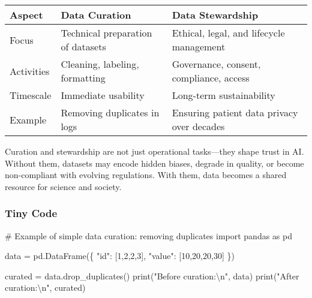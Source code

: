\documentclass[
  letterpaper,
  DIV=11,
  numbers=noendperiod]{scrreprt}
\newenvironment{Shaded}{\begin{snugshade}}{\end{snugshade}}
\newcommand{\BuiltInTok}[1]{\textcolor[rgb]{0.00,0.23,0.31}{#1}}
\newcommand{\CharTok}[1]{\textcolor[rgb]{0.13,0.47,0.30}{#1}}
\newcommand{\CommentTok}[1]{\textcolor[rgb]{0.37,0.37,0.37}{#1}}
\newcommand{\DecValTok}[1]{\textcolor[rgb]{0.68,0.00,0.00}{#1}}
\newcommand{\ImportTok}[1]{\textcolor[rgb]{0.00,0.46,0.62}{#1}}
\newcommand{\NormalTok}[1]{\textcolor[rgb]{0.00,0.23,0.31}{#1}}
\newcommand{\OperatorTok}[1]{\textcolor[rgb]{0.37,0.37,0.37}{#1}}
\newcommand{\StringTok}[1]{\textcolor[rgb]{0.13,0.47,0.30}{#1}}
\begin{document}
\begin{longtable}[]{@{}
  >{\raggedright\arraybackslash}p{}
  >{\raggedright\arraybackslash}p{}
  >{\raggedright\arraybackslash}p{}@{}}
\toprule\noalign{}
\begin{minipage}[b]{\linewidth}\raggedright
Aspect
\end{minipage} & \begin{minipage}[b]{\linewidth}\raggedright
Data Curation
\end{minipage} & \begin{minipage}[b]{\linewidth}\raggedright
Data Stewardship
\end{minipage} \\
\midrule\noalign{}
\endhead
\bottomrule\noalign{}
\endlastfoot
Focus & Technical preparation of datasets & Ethical, legal, and
lifecycle management \\
Activities & Cleaning, labeling, formatting & Governance, consent,
compliance, access \\
Timescale & Immediate usability & Long-term sustainability \\
Example & Removing duplicates in logs & Ensuring patient data privacy
over decades \\
\end{longtable}

Curation and stewardship are not just operational tasks---they shape
trust in AI. Without them, datasets may encode hidden biases, degrade in
quality, or become non-compliant with evolving regulations. With them,
data becomes a shared resource for science and society.

\subsubsection{Tiny Code}\label{tiny-code-78}

\begin{Shaded}
\begin{Highlighting}[]
\CommentTok{\# Example of simple data curation: removing duplicates}
\ImportTok{import}\NormalTok{ pandas }\ImportTok{as}\NormalTok{ pd}

\NormalTok{data }\OperatorTok{=}\NormalTok{ pd.DataFrame(\{}
    \StringTok{"id"}\NormalTok{: [}\DecValTok{1}\NormalTok{,}\DecValTok{2}\NormalTok{,}\DecValTok{2}\NormalTok{,}\DecValTok{3}\NormalTok{],}
    \StringTok{"value"}\NormalTok{: [}\DecValTok{10}\NormalTok{,}\DecValTok{20}\NormalTok{,}\DecValTok{20}\NormalTok{,}\DecValTok{30}\NormalTok{]}
\NormalTok{\})}

\NormalTok{curated }\OperatorTok{=}\NormalTok{ data.drop\_duplicates()}
\BuiltInTok{print}\NormalTok{(}\StringTok{"Before curation:}\CharTok{\textbackslash{}n}\StringTok{"}\NormalTok{, data)}
\BuiltInTok{print}\NormalTok{(}\StringTok{"After curation:}\CharTok{\textbackslash{}n}\StringTok{"}\NormalTok{, curated)}
\end{Highlighting}
\end{Shaded}
\end{document}
